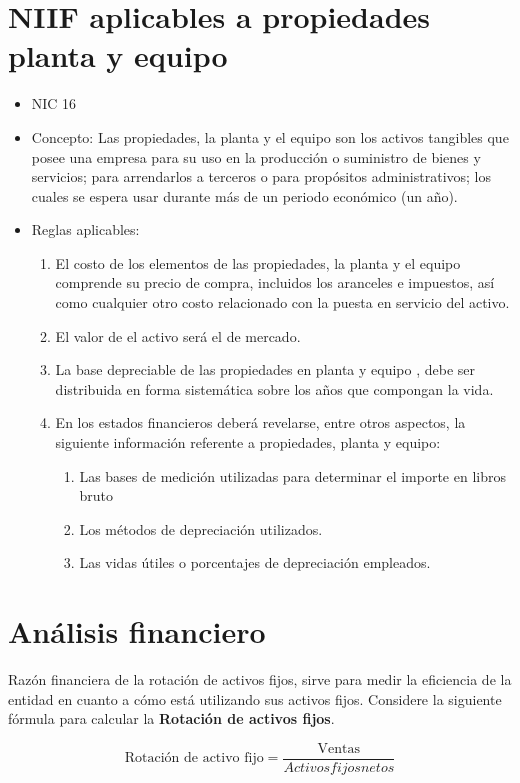\documentclass{article}
\begin{document}
\section{NIIF aplicables a propiedades planta y equipo}
\begin{itemize}
    \item NIC 16
    \item Concepto: Las propiedades, la planta y el equipo son los activos tangibles que posee una empresa para su uso en la producción o suministro de bienes y servicios; para arrendarlos a terceros o para propósitos administrativos; los cuales se espera usar durante más de un periodo económico (un año).
    \item Reglas aplicables: 
        \begin{enumerate}
            \item El costo de los elementos de las propiedades, la planta y el equipo comprende su precio de compra, incluidos los aranceles e impuestos, así como cualquier otro costo relacionado con la puesta en servicio del activo.
            \item El valor de el activo será el de mercado.
            \item La base depreciable de las propiedades en planta y equipo , debe ser distribuida en forma sistemática sobre los años que compongan la vida.
            \item En los estados financieros deberá revelarse, entre otros aspectos, la siguiente información referente a propiedades, planta y equipo:
                \begin{enumerate}
                    \item  Las bases de medición utilizadas para determinar el importe en libros bruto
                    \item Los métodos de depreciación utilizados.
                    \item  Las vidas útiles o porcentajes de depreciación empleados.
                \end{enumerate}
        \end{enumerate}
\end{itemize}

\section{Análisis financiero}
Razón financiera de la rotación de activos fijos, sirve para medir la eficiencia de la entidad en cuanto a cómo está utilizando sus activos fijos. Considere la siguiente fórmula para calcular la \textbf{Rotación de activos fijos}. \newline 
\begin{center}
   \[
     \text{Rotación de activo fijo} = \frac{\text{Ventas}}{Activos fijos netos}
   \]
\end{center}
\end{document}

